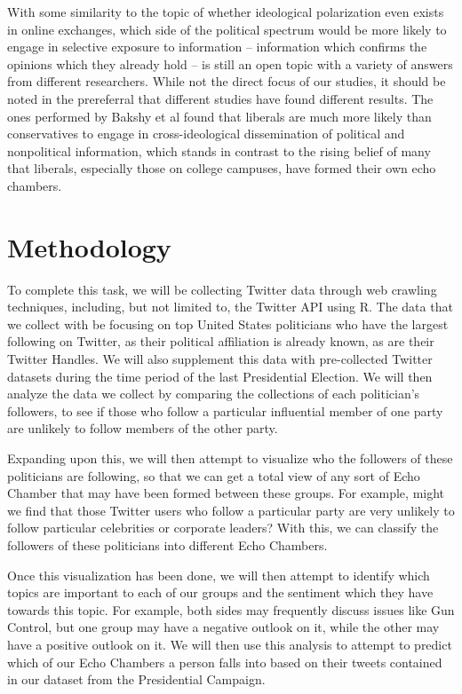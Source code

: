 \documentclass[journal]{IEEEtran}
\begin{document}
With some similarity to the topic of whether ideological polarization even exists in online exchanges, which side of the political spectrum would be more likely to engage in selective exposure to information -- information which confirms the opinions which they already hold -- is still an open topic with a variety of answers from different researchers. While not the direct focus of our studies, it should be noted in the prereferral that different studies have found different results. The ones performed by Bakshy et al found that liberals are much more likely than conservatives to engage in cross-ideological dissemination of political and nonpolitical information, which stands in contrast to the rising belief of many that liberals, especially those on college campuses, have formed their own echo chambers. 

\section{Methodology}

To complete this task, we will be collecting Twitter data through web crawling techniques, including, but not limited to, the Twitter API using R. The data that we collect with be focusing on top United States politicians who have the largest following on Twitter, as their political affiliation is already known, as are their Twitter Handles. We will also supplement this data with pre-collected Twitter datasets during the time period of the last Presidential Election. We will then analyze the data we collect by comparing the collections of each politician’s followers, to see if those who follow a particular influential member of one party are unlikely to follow members of the other party. 

Expanding upon this, we will then attempt to visualize who the followers of these politicians are following, so that we can get a total view of any sort of Echo Chamber that may have been formed between these groups. For example, might we find that those Twitter users who follow a particular party are very unlikely to follow particular celebrities or corporate leaders? With this, we can classify the followers of these politicians into different Echo Chambers. 

Once this visualization has been done, we will then attempt to identify which topics are important to each of our groups and the sentiment which they have towards this topic. For example, both sides may frequently discuss issues like Gun Control, but one group may have a negative outlook on it, while the other may have a positive outlook on it. We will then use this analysis to attempt to predict which of our Echo Chambers a person falls into based on their tweets contained in our dataset from the Presidential Campaign.
\end{document}
